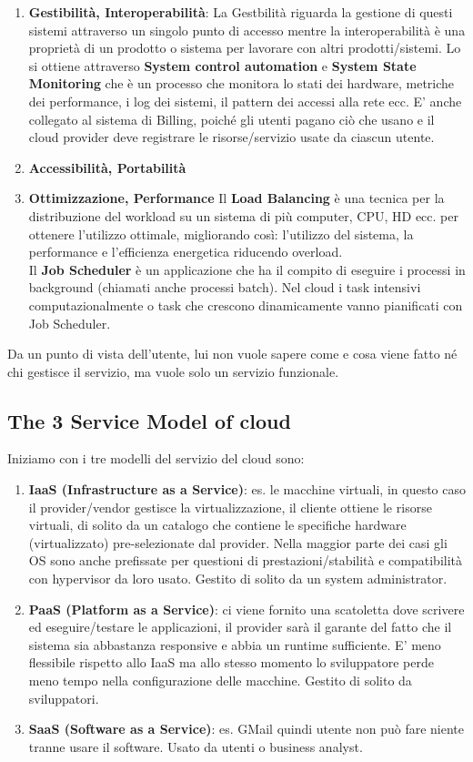 \documentclass[11pt, twocolumn]{article}
\begin{document}
\begin{enumerate}[noitemsep, topsep=0ex, leftmargin=*]
	\item \textbf{Gestibilità, Interoperabilità}:
	La Gestbilità riguarda la gestione di questi sistemi attraverso un singolo punto di accesso mentre la interoperabilità è una proprietà di un prodotto o sistema per lavorare con altri prodotti/sistemi.
	Lo si ottiene attraverso \textbf{System control automation} e \textbf{System State Monitoring} che è un processo che monitora lo stati dei hardware, metriche dei performance, i log dei sistemi, il pattern dei accessi alla rete ecc.
	E' anche collegato al sistema di Billing, poiché gli utenti pagano ciò che usano e il cloud provider deve registrare le risorse/servizio usate da ciascun utente.\\
	\item \textbf{Accessibilità, Portabilità}
	
	\item \textbf{Ottimizzazione, Performance}
	Il \textbf{Load Balancing} è una tecnica per la distribuzione del workload su un sistema di più computer, CPU, HD ecc. per ottenere l'utilizzo ottimale, migliorando così: l'utilizzo del sistema, la performance e l'efficienza energetica riducendo overload.\\
	Il \textbf{Job Scheduler} è un applicazione che ha il compito di eseguire i processi in background (chiamati anche processi batch).
	Nel cloud i task intensivi computazionalmente o task che crescono dinamicamente vanno pianificati con Job Scheduler.
\end{enumerate}
Da un punto di vista dell'utente, lui non vuole sapere come e cosa viene fatto né chi gestisce il servizio, ma vuole solo un servizio funzionale.

\subsection{The 3 Service Model of cloud}
Iniziamo con i tre modelli del servizio del cloud sono:
\begin{enumerate}[wide, topsep=0ex, noitemsep]
	\item \textbf{IaaS (Infrastructure as a Service)}: es. le macchine virtuali, in questo caso il provider/vendor gestisce la virtualizzazione, il cliente ottiene le risorse virtuali, di solito da un catalogo che contiene le specifiche hardware (virtualizzato) pre-selezionate dal provider. Nella maggior parte dei casi gli OS sono anche prefissate per questioni di prestazioni/stabilità e compatibilità con hypervisor da loro usato. Gestito di solito da un system administrator.
	\item \textbf{PaaS (Platform as a Service)}: ci viene fornito una scatoletta dove scrivere ed eseguire/testare le applicazioni, il provider sarà il garante del fatto che il sistema sia abbastanza responsive e abbia un runtime sufficiente. E' meno flessibile rispetto allo IaaS ma allo stesso momento lo sviluppatore perde meno tempo nella configurazione delle macchine. Gestito di solito da sviluppatori.
	\item \textbf{SaaS (Software as a Service)}: es. GMail quindi utente non può fare niente tranne usare il software. Usato da utenti o business analyst.
\end{enumerate}
\end{document}
